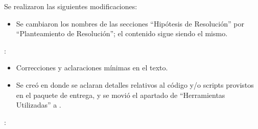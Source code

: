 \documentclass[11pt, a4paper, twoside]{article}
\begin{document}
{}

Se realizaron las siguientes modificaciones:

\begin{itemize}
\item Se cambiaron los nombres de las secciones ``Hipótesis de Resolución''
por ``Planteamiento de Resolución''; el contenido sigue siendo el mismo.
\end{itemize}

:
\begin{itemize}[leftmargin=+4em]
  \item Correcciones y aclaraciones mínimas en el texto.
    
    \item Se creó 
    en donde se aclaran detalles relativos al código 
    y/o scripts provistos en el paquete de entrega, 
    y se movió el apartado de ``Herramientas Utilizadas'' 
    a .
\end{itemize}


    
    
    

:
\end{document}
